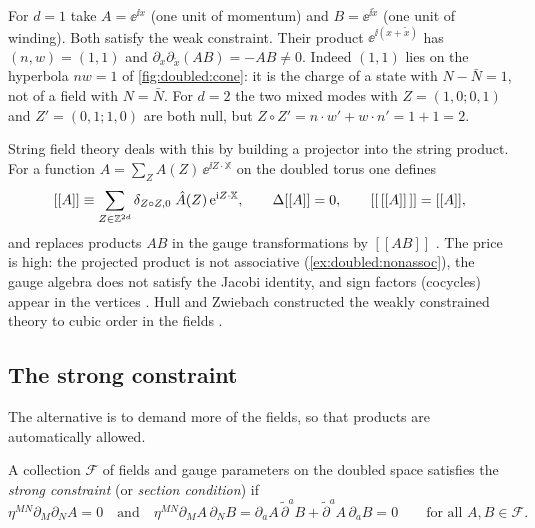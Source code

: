 \begin{example}\label{ex:doubled:failure}
For $d=1$ take $A=\ee^{\ii x}$ (one unit of momentum) and $B=\ee^{\ii\tilde x}$ (one unit of
winding). Both satisfy the weak constraint. Their product $\ee^{\ii(x+\tilde x)}$ has
$(n,w)=(1,1)$ and $\partial_x\partial_{\tilde x}(AB)=-AB\neq0$. Indeed $(1,1)$ lies on the
hyperbola $nw=1$ of \cref{fig:doubled:cone}: it is the charge of a state with
$N-\bar N=1$, not of a field with $N=\bar N$. For $d=2$ the two mixed modes with
$Z=(1,0;0,1)$ and $Z'=(0,1;1,0)$ are both null, but $Z\circ Z'=n\cdot w'+w\cdot n'=1+1=2$.
\end{example}

String field theory deals with this by building a projector into the string product. For a
function $A=\sum_Z\hat A(Z)\,\ee^{\ii Z\cdot\mathbb X}$ on the doubled torus one defines
\begin{equation}\label{eq:doubled:proj}
[[A]]\equiv\sum_{Z\in\mathbb{Z}^{2d}}\delta_{Z\circ Z,0}\;\hat A(Z)\,\mathrm{e}^{\mathrm{i} Z\cdot\mathbb X},
\qquad \Delta[[A]]=0,\qquad [[\,[[A]]\,]]=[[A]] ,
\end{equation}
%
and replaces products $AB$ in the gauge transformations by $[[AB]]$ . The price is high: the projected product is not
associative (\cref{ex:doubled:nonassoc}), the gauge algebra does not satisfy the Jacobi
identity, and sign factors (cocycles) appear in the vertices . Hull and Zwiebach constructed the weakly constrained theory to cubic
order in the fields .

\subsection{The strong constraint}

The alternative is to demand more of the fields, so that products are automatically allowed.

\begin{definition}\label{def:doubled:strong}
%
A collection $\mathcal F$ of fields and gauge parameters on the doubled space satisfies the
\emph{strong constraint} (or \emph{section condition}) if
\begin{equation}\label{eq:doubled:strong}
\eta^{MN}\partial_M\partial_N A=0\quad\text{and}\quad
\eta^{MN}\partial_MA\,\partial_NB=\partial_aA\,\tilde\partial^aB+\tilde\partial^aA\,\partial_aB
=0\qquad\text{for all }A,B\in\mathcal F .
\end{equation}
\end{definition}

